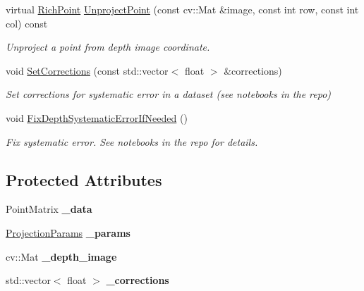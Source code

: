 \begin{DoxyCompactItemize}
virtual \hyperlink{classdepth__clustering_1_1RichPoint}{Rich\+Point} \hyperlink{classdepth__clustering_1_1CloudProjection_ab552ac1dbb56e077679d9f0268c79a44}{Unproject\+Point} (const cv\+::\+Mat \&image, const int row, const int col) const
\begin{DoxyCompactList}\small\item\em Unproject a point from depth image coordinate. \end{DoxyCompactList}\item 
void \hyperlink{classdepth__clustering_1_1CloudProjection_afcc642064042bba2a1112ed2a37190f9}{Set\+Corrections} (const std\+::vector$<$ float $>$ \&corrections)
\begin{DoxyCompactList}\small\item\em Set corrections for systematic error in a dataset (see notebooks in the repo) \end{DoxyCompactList}\item 
\mbox{\label{classdepth__clustering_1_1CloudProjection_a84476c5e25ccf70876f67622a280ac63}} 
void \hyperlink{classdepth__clustering_1_1CloudProjection_a84476c5e25ccf70876f67622a280ac63}{Fix\+Depth\+Systematic\+Error\+If\+Needed} ()
\begin{DoxyCompactList}\small\item\em Fix systematic error. See notebooks in the repo for details. \end{DoxyCompactList}\end{DoxyCompactItemize}
\subsection*{Protected Attributes}
\begin{DoxyCompactItemize}
\item 
\mbox{\label{classdepth__clustering_1_1CloudProjection_a3f70579b10bd93a7d5ac4b1f0d387701}} 
Point\+Matrix {\bfseries \+\_\+data}
\item 
\mbox{\label{classdepth__clustering_1_1CloudProjection_a8978a85d52212a2a88cbb3c6791eddd6}} 
\hyperlink{classdepth__clustering_1_1ProjectionParams}{Projection\+Params} {\bfseries \+\_\+params}
\item 
\mbox{\label{classdepth__clustering_1_1CloudProjection_a2d239a9a0fcaada00de36aad436e2af2}} 
cv\+::\+Mat {\bfseries \+\_\+depth\+\_\+image}
\item 
\mbox{\label{classdepth__clustering_1_1CloudProjection_a034b1066d16e2215016ab11f6c323aef}} 
std\+::vector$<$ float $>$ {\bfseries \+\_\+corrections}
\end{DoxyCompactItemize}



